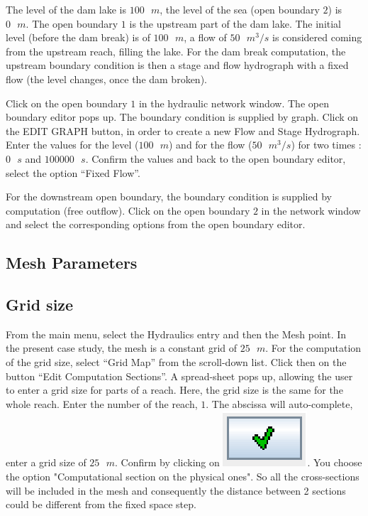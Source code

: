 \documentclass[a4paper,12pt]{article}
\begin{document}
\hspace{0.5cm} The level of the dam lake is $100\mbox{ }m$, the level of the sea (open boundary
$2$) is $0\mbox{ }m$. The open boundary $1$ is the upstream part of the dam lake.
The initial level (before the dam break) is of $100\mbox{ }m$, a flow of $50\mbox{ }m^3/s$
is considered coming from the upstream reach, filling the lake. For
the dam break computation, the upstream boundary condition is then
a stage and flow hydrograph with a fixed flow (the level changes,
once the dam broken). 

\vspace{0.5cm}

Click on the open boundary $1$ in the hydraulic network window. The
open boundary editor pops up. The boundary condition is supplied by
graph. Click on the EDIT GRAPH button, in order to create a new Flow
and Stage Hydrograph. Enter the values for the level ($100\mbox{ }m$) and for
the flow ($50\mbox{ }m^3/s$) for two times : $0\mbox{ }s$ and $100000\mbox{ }s$. Confirm the values
and back to the open boundary editor, select the option {}``Fixed
Flow''.

\vspace{0.5cm}

For the downstream open boundary, the boundary condition is supplied
by computation (free outflow). Click on the open boundary $2$ in the
network window and select the corresponding options from the open
boundary editor.

\subsection{Mesh Parameters}

\subsection{Grid size }

\hspace{0.5cm}From the main menu, select the Hydraulics entry and then the Mesh
point. In the present case study, the mesh is a constant grid of $25\mbox{ }m$.
For the computation of the grid size, select {}``Grid Map'' from
the scroll-down list. Click then on the button {}``Edit Computation
Sections''. A spread-sheet pops up, allowing the user to enter
a grid size for parts of a reach. Here, the grid size is the same
for the whole reach. Enter the number of the reach, $1$. The abscissa
will auto-complete, enter a grid size of $25\mbox{ }m$. Confirm by clicking
on \includegraphics[scale=0.6]{valid}. You choose the option "Computational section on the physical ones".
So all the cross-sections will be included in the mesh and consequently the distance between 2 sections could be different from the fixed space step.
\end{document}
